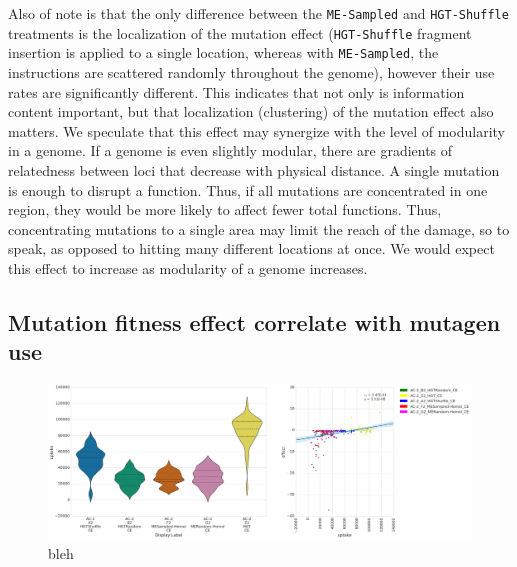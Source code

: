 \documentclass[PhD]{msu-thesis}
\begin{document}
Also of note is that the only difference between the \texttt{ME-Sampled} and \texttt{HGT-Shuffle} treatments is the localization of the mutation effect
(\texttt{HGT-Shuffle} fragment insertion is applied to a single location, whereas with \texttt{ME-Sampled}, the instructions are scattered randomly throughout the genome), however their use rates are significantly different. This indicates that not only is information content important, but that localization (clustering) of the mutation effect also matters.
We speculate that this effect may synergize with the level of modularity in a genome. If a genome is even slightly modular, there are gradients of relatedness between loci that decrease with physical distance. A single mutation is enough to disrupt a function. Thus, if all mutations are concentrated in one region, they would be more likely to affect fewer total functions.  Thus, concentrating mutations to a single area may limit the reach of the damage, so to speak, as opposed to hitting many different locations at once. We would expect this effect to increase as modularity of a genome increases.





\subsection{Mutation fitness effect correlate with mutagen use}
\begin{figure}[h!]
\begin{center}
\includegraphics[width=0.7\columnwidth]{figures/HGT/mutagen_use_vs_fitness_effect.png}
\caption{bleh
}\label{fig:mutagen_use_vs_fitness_effect}
\end{center}
\end{figure}
\end{document}
